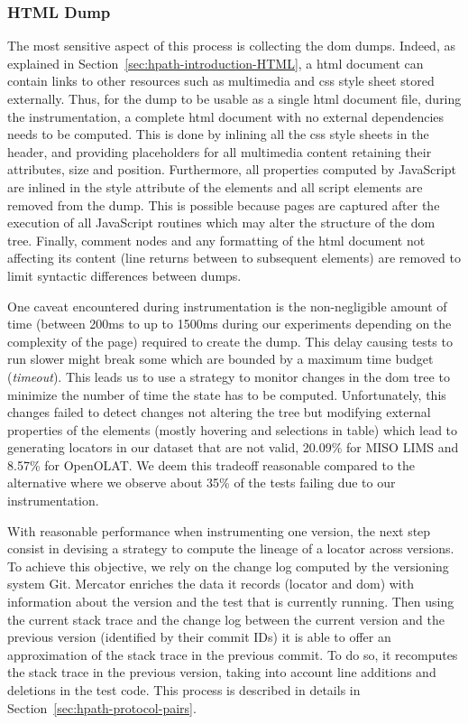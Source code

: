 \subsubsection{HTML Dump}
\label{sec:hpath-protocol-capture}

The most sensitive aspect of this process is collecting the \gls{dom} dumps. Indeed, as explained in Section~\ref{sec:hpath-introduction-HTML}, a \gls{html} document can contain links to other resources such as multimedia and \gls{css} style sheet stored externally. Thus, for the dump to be usable as a single \gls{html} document file, during the instrumentation, a complete \gls{html} document with no external dependencies needs to be computed. This is done by inlining all the \gls{css} style sheets in the header, and providing placeholders for all multimedia content retaining their attributes, size and position. Furthermore, all properties computed by JavaScript are inlined in the style attribute of the elements and all script elements are removed from the dump. This is possible because pages are captured after the execution of all JavaScript routines which may alter the structure of the \gls{dom} tree. Finally, comment nodes and any formatting of the \gls{html} document not affecting its content (line returns between to subsequent elements) are removed to limit syntactic differences between dumps.

One caveat encountered during instrumentation is the non-negligible amount of time (between 200ms to up to 1500ms during our experiments depending on the complexity of the page) required to create the dump. This delay causing tests to run slower might break some which are bounded by a maximum time budget (\emph{timeout}). This leads us to use a strategy to monitor changes in the \gls{dom} tree to minimize the number of time the state has to be computed. Unfortunately, this changes failed to detect changes not altering the tree but modifying external properties of the elements (mostly hovering and selections in table) which lead to generating locators in our dataset that are not valid, 20.09\% for MISO LIMS and 8.57\% for OpenOLAT. We deem this tradeoff reasonable compared to the alternative where we observe about 35\% of the tests failing due to our instrumentation.

With reasonable performance when instrumenting one version, the next step consist in devising a strategy to compute the lineage of a locator across versions. To achieve this objective, we rely on the change log computed by the versioning system Git. Mercator enriches the data it records (locator and \gls{dom}) with information about the version and the test that is currently running. Then using the current stack trace and the change log between the current version and the previous version (identified by their commit IDs) it is able to offer an approximation of the stack trace in the previous commit. To do so, it recomputes the stack trace in the previous version, taking into account line additions and deletions in the test code. This process is described in details in Section~\ref{sec:hpath-protocol-pairs}.

